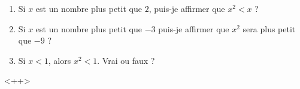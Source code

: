 
\begin{exercice}\label{exosmath-0140}

    \begin{enumerate}
        \item
            Si \( x\) est un nombre plus petit que \( 2\), puis-je affirmer que \( x^2<x\) ?
        \item
            Si \( x\) est un nombre plus petit que \( -3\) puis-je affirmer que \( x^2\) sera plus petit que \( -9\) ?
        \item
            Si \( x<1\), alors \( x^2<1\). Vrai ou faux ?
    \end{enumerate}
    <++>

\end{exercice}
